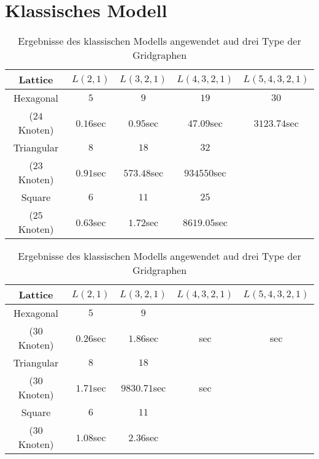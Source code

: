 \documentclass[
	fontsize=12pt,
	paper=a4,
	twoside=false,
	numbers=noenddot,
	plainheadsepline,
	toc=listof,
	toc=bibliography
]{scrartcl}
\begin{document}
\section{Klassisches Modell}
\begin{table}[htbp]
\centering
\begin{tabular}{|c|c|c|c|c|}
\hline 
	Lattice    & $L(2,1)$   & $L(3,2,1)$ & $L(4,3,2,1)$ & $L(5,4,3,2,1)$ \\ \hline 
	Hexagonal  & $5$        & $9$        & $19$         & $30$           \\ 
($24$ Knoten)  & $0.16$sec  & $0.95$sec  & $47.09$sec   & $3123.74$sec   \\ \hline
			   
	Triangular& $8$	        & $18$        &  $32$            &    \\ 
($23$ Knoten) & $0.91$sec   & $573.48$sec &  $934550$sec     &    \\ \hline
			  
	Square    &  $6$	    &  $11$       & $25$         &    \\ 
($25$ Knoten) & $0.63$sec   &  $1.72$sec  & $8619.05$sec & \\ \hline
\end{tabular}
\caption{ Ergebnisse des klassischen Modells angewendet aud drei Type der Gridgraphen} 
\label{Table:T0}
\end{table}

\begin{table}[htbp]
\centering
\begin{tabular}{|c|c|c|c|c|}
\hline 
	Lattice    & $L(2,1)$   & $L(3,2,1)$ & $L(4,3,2,1)$ & $L(5,4,3,2,1)$ \\ \hline 
	
	Hexagonal  & $5$        & $9$        &              &            \\ 
($30$ Knoten)  & $0.26$sec  & $1.86$sec  & sec          & sec   \\ \hline
			   
	Triangular& $8$	        & $18$         &              &    \\ 
($30$ Knoten) & $1.71$sec  & $9830.71$sec &  sec     &    \\ \hline
			  
	Square    & $6$	        & $11$       &              &    \\ 
($30$ Knoten) & $1.08$sec  & $2.36$sec   &             & \\ \hline

\end{tabular}
\caption{ Ergebnisse des klassischen Modells angewendet aud drei Type der Gridgraphen} 
\label{Table:T0}
\end{table}
\end{document}
